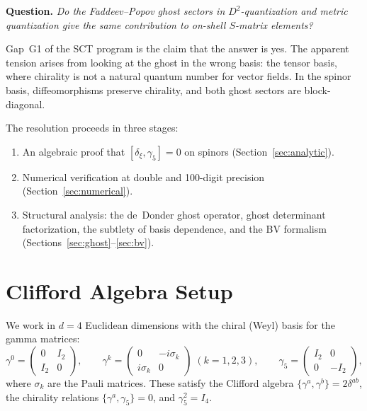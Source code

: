 \documentclass[11pt,a4paper]{article}
\begin{document}
\medskip
\noindent\textbf{Question.}
\textit{Do the Faddeev--Popov ghost sectors in $D^2$-quantization and
metric quantization give the same contribution to on-shell $S$-matrix
elements?}
\medskip

Gap~G1 of the SCT program is the claim that the answer is yes.  The
apparent tension arises from looking at the ghost in the wrong basis:
the tensor basis, where chirality is not a natural quantum number for
vector fields.  In the spinor basis, diffeomorphisms preserve chirality,
and both ghost sectors are block-diagonal.

The resolution proceeds in three stages:
\begin{enumerate}
  \item An algebraic proof that $[\delta_\xi, \gamma_5] = 0$ on spinors
    (Section~\ref{sec:analytic}).
  \item Numerical verification at double and 100-digit precision
    (Section~\ref{sec:numerical}).
  \item Structural analysis: the de~Donder ghost operator, ghost
    determinant factorization, the subtlety of basis dependence,
    and the BV formalism (Sections~\ref{sec:ghost}--\ref{sec:bv}).
\end{enumerate}

\section{Clifford Algebra Setup}
\label{sec:clifford}

We work in $d=4$ Euclidean dimensions with the chiral (Weyl) basis
for the gamma matrices:
\begin{equation}\label{eq:gamma-chiral}
  \gamma^0 = \begin{pmatrix} 0 & I_2 \\ I_2 & 0 \end{pmatrix}, \qquad
  \gamma^k = \begin{pmatrix} 0 & -i\sigma_k \\ i\sigma_k & 0 \end{pmatrix}
  \; (k=1,2,3), \qquad
  \gamma_5 = \begin{pmatrix} I_2 & 0 \\ 0 & -I_2 \end{pmatrix},
\end{equation}
where $\sigma_k$ are the Pauli matrices.  These satisfy the Clifford
algebra $\{\gamma^a, \gamma^b\} = 2\delta^{ab}$, the chirality
relations $\{\gamma^a, \gamma_5\} = 0$, and $\gamma_5^2 = I_4$.
\end{document}
